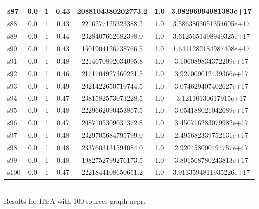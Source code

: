 \documentclass{article}
\begin{document}
\begin{tabular}{|l|c|c|c|c|c|c|}
\hline
s87 &0.0 & 1 & 0.43 & 2088104380202773.2 & 1.0 & 3.08296994981383e+17\\
\hline
s88 &0.0 & 1 & 0.43 & 2216277125323388.2 & 1.0 & 3.5863803051354605e+17\\
\hline
s89 &0.0 & 1 & 0.44 & 2328407662682398.0 & 1.0 & 3.6125651498949325e+17\\
\hline
s90 &0.0 & 1 & 0.43 & 1601904126738766.5 & 1.0 & 1.6411282184987408e+17\\
\hline
s91 &0.0 & 1 & 0.48 & 2214670892034095.8 & 1.0 & 3.106089834372209e+17\\
\hline
s92 &0.0 & 1 & 0.46 & 2171704927360221.5 & 1.0 & 3.927009012439366e+17\\
\hline
s93 &0.0 & 1 & 0.49 & 2021422650719744.5 & 1.0 & 3.074629407402627e+17\\
\hline
s94 &0.0 & 1 & 0.47 & 2381582573073228.5 & 1.0 & 3.12110130617915e+17\\
\hline
s95 &0.0 & 1 & 0.48 & 2229662090453867.5 & 1.0 & 3.054188021042689e+17\\
\hline
s96 &0.0 & 1 & 0.47 & 2087105309031372.8 & 1.0 & 3.450716283079982e+17\\
\hline
s97 &0.0 & 1 & 0.48 & 2329705684795799.0 & 1.0 & 2.495682339752131e+17\\
\hline
s98 &0.0 & 1 & 0.48 & 2337603131594084.0 & 1.0 & 2.920458000494757e+17\\
\hline
s99 &0.0 & 1 & 0.48 & 1982752799276173.5 & 1.0 & 3.801568780243813e+17\\
\hline
s100 &0.0 & 1 & 0.47 & 2221844108650651.2 & 1.0 & 3.9133594811935226e+17\\
\hline
\end{tabular}\\

\noindent Results for H\&A with 100 sources graph ncpr.
\end{document}
